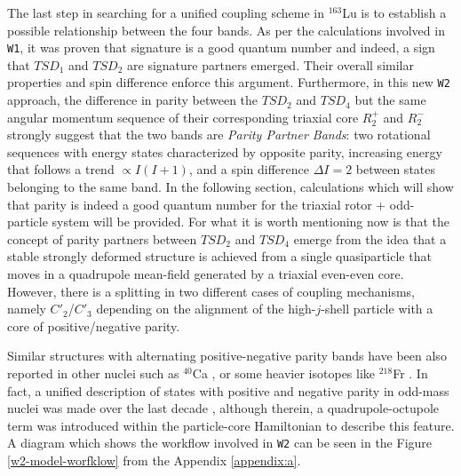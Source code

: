 \documentclass[myclassdoc,debug]{rjparticle}
\begin{document}
The last step in searching for a unified coupling scheme in $^{163}$Lu is to establish a possible relationship between the four bands. As per the calculations involved in \texttt{W1}, it was proven that signature is a good quantum number and indeed, a sign that $TSD_1$ and $TSD_2$ are signature partners emerged. Their overall similar properties and spin difference enforce this argument. Furthermore, in this new \texttt{W2} approach, the difference in parity between the $TSD_2$ and $TSD_4$ but the same angular momentum sequence of their corresponding triaxial core $R_2^+$ and $R_2^-$ strongly suggest that the two bands are \emph{Parity Partner Bands}: two rotational sequences with energy states characterized by opposite parity, increasing energy that follows a trend $\propto I(I+1)$, and a spin difference $\Delta I=2$ between states belonging to the same band. In the following section, calculations which will show that parity is indeed a good quantum number for the triaxial rotor + odd-particle system will be provided. For what it is worth mentioning now is that the concept of parity partners between $TSD_2$ and $TSD_4$ emerge from the idea that a stable strongly deformed structure is achieved from a single quasiparticle that moves in a quadrupole mean-field generated by a triaxial even-even core. However, there is a splitting in two different cases of coupling mechanisms, namely $C'_2$/$C'_3$ depending on the alignment of the high-$j$-shell particle with a core of positive/negative parity.

Similar structures with alternating positive-negative parity bands have been also reported in other nuclei such as $^{40}$Ca \cite{torilov2004spectroscopy}, or some heavier isotopes like $^{218}$Fr \cite{debray2000alternating}. In fact, a unified description of states with positive and negative parity in odd-mass nuclei was made over the last decade \cite{radutaa2009csm,raduta2011simultaneous}, although therein, a quadrupole-octupole term was introduced within the particle-core Hamiltonian to describe this feature. A diagram which shows the workflow involved in \texttt{W2} can be seen in the Figure \ref{w2-model-worfklow} from the Appendix \ref{appendix:a}.
\end{document}
